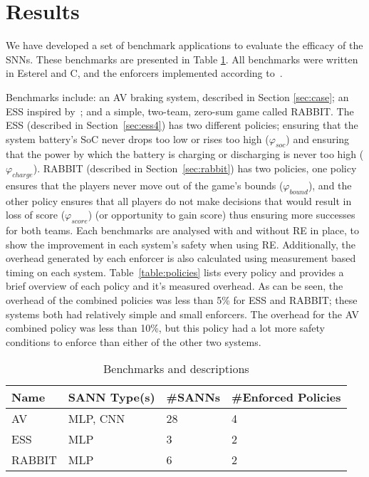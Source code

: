 
\section{Results}
\label{sec:resultsc4}

We have developed a set of benchmark applications to evaluate the efficacy of the \acp{SNN}.
These benchmarks are presented in Table \ref{table:benchmarks4}.
All benchmarks were written in Esterel and C, and the enforcers implemented according to~\cite{recps}.


Benchmarks include: an \acf{AV} braking system, described in Section \ref{sec:case}; an \acf{ESS} inspired by~\cite{chaudhari2017hybrid}; and a simple, two-team, zero-sum game called RABBIT.
The \ac{ESS} (described in Section~\ref{sec:ess4}) has two different policies; ensuring that the system battery's \ac{SoC} never drops too low or rises too high  ($\varphi_{soc}$) and ensuring that the power by which the battery is charging or discharging is never too high ($\varphi_{charge}$).
RABBIT (described in Section~\ref{sec:rabbit}) has two policies, one policy ensures that the players never move out of the game's bounds ($\varphi_{bound}$), and the other policy ensures that all players do not make decisions that would result in loss of score ($\varphi_{score}$) (or opportunity to gain score) thus ensuring more successes for both teams.
Each benchmarks are analysed with and without \ac{RE} in place, to show the improvement in each system's safety when using \ac{RE}.
Additionally, the overhead generated by each enforcer is also calculated using measurement based timing on each system. 
Table~\ref{table:policies} lists every policy and provides a brief overview of each policy and it's measured overhead.
As can be seen, the overhead of the combined policies was less than 5\% for \ac{ESS} and RABBIT; these systems both had relatively simple and small enforcers.
The overhead for the \ac{AV} combined policy was less than 10\%, but this policy had a lot more safety conditions to enforce than either of the other two systems. 

\begin{table}[b]
	\centering
	\caption{Benchmarks and descriptions}
	\label{table:benchmarks4}
	\begin{tabular}{@{}|l|l|l|l|@{}}
		\hline
		Name & \ac{SANN} Type(s) & \#\acp{SANN} & \#Enforced Policies \\ \hline
		\acs{AV} & \ac{MLP}, \ac{CNN}  & 28 & 4 \\
		\acs{ESS} & \ac{MLP} & 3 & 2 \\
		RABBIT & \ac{MLP}  & 6 & 2 \\
		\hline
	\end{tabular}
\end{table}

